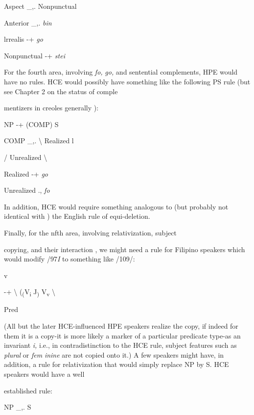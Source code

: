\ea\label{ex:101}
 Aspect \_,. Nonpunctual
\glt
\z

\ea\label{ex:102}
 Anterior \_,. \textit{bin}
\glt
\z

\ea\label{ex:103}
 lrrealis {}-+ \textit{go}
\glt
\z

\ea\label{ex:104}
 Nonpunctual {}-+ \textit{stei}
\glt
\z


For the fourth area, involving \textit{fo,} \textit{go,} and sentential comple\-ments, HPE would have no rules. HCE would possibly have something like the following PS rule (but see Chapter 2 on the status of comple\-

mentizers in creoles generally ):

\ea\label{ex:105}
NP {}-+ (COMP) S
\glt
\z

\ea\label{ex:106}
 COMP \_,. {\textbackslash} Realized l
\glt
\z

/ Unrealized {\textbackslash}

\ea\label{ex:107}
 Realized {}-+ \textit{go}
\glt
\z

\ea\label{ex:108}
Unrealized ., \textit{fo}
\glt
\z

In addition, HCE would require something analogous to (but probably not identical with ) the English rule of equi-deletion.

Finally, for the nfth area, involving relativization, subject\-

copying, and their interaction , we might need a rule for Filipino speak\-ers which would modify /97\textit{I} to something like /109/:

\ea\label{ex:109}
 v
\glt
\z

{}-+ {\textbackslash} (\textsubscript{(}V\textsubscript{i}\textsubscript{ }J\textsubscript{) }V\textsubscript{v}\textsubscript{ }{\textbackslash}

Pred

(All but the later HCE-influenced HPE speakers realize the copy, if indeed for them it is a copy-it is more likely a marker of a particular predicate type-as an invariant \textit{i, }i.e., in contradistinction to the HCE rule, subject features such as \textit{plural }or \textit{fem} \textit{inine} are not copied onto it.) A few speakers might have, in addition, a rule for relativization that would simply replace NP by S. HCE speakers would have a well\-

established rule:

\ea\label{ex:110}
 NP \_,. S
\glt
\z


